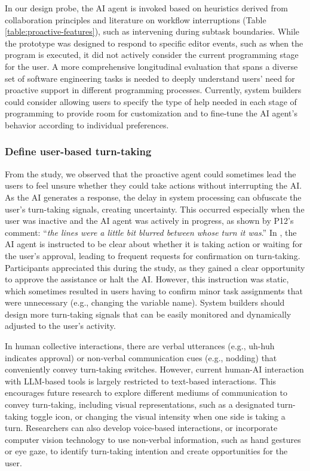 In our design probe, the AI agent is invoked based on heuristics derived from collaboration principles and literature on workflow interruptions (Table \ref{table:proactive-features}), such as intervening during subtask boundaries.
While the prototype was designed to respond to specific editor events, such as when the program is executed, it did not actively consider the current programming stage for the user.
A more comprehensive longitudinal evaluation that spans a diverse set of software engineering tasks is needed to deeply understand users' need for proactive support in different programming processes.
Currently, system builders could consider allowing users to specify the type of help needed in each stage of programming to provide room for customization and to fine-tune the AI agent's behavior according to individual preferences.


\subsubsection{\textbf{Define user-based turn-taking}}
From the study, we observed that the proactive agent could sometimes lead the users to feel unsure whether they could take actions without interrupting the AI.
As the AI generates a response, the delay in system processing can obfuscate the user's turn-taking signals, creating uncertainty. 
This occurred especially when the user was inactive and the AI agent was actively in progress, as shown by P12's comment: ``\textit{the lines were a little bit blurred between whose turn it was}.''
In \sys{}, the AI agent is instructed to be clear about whether it is taking action or waiting for the user's approval, leading to frequent requests for confirmation on turn-taking.
Participants appreciated this during the study, as they gained a clear opportunity to approve the assistance or halt the AI.
However, this instruction was static, which sometimes resulted in users having to confirm minor task assignments that were unnecessary (e.g., changing the variable name).
System builders should design more turn-taking signals that can be easily monitored and dynamically adjusted to the user's activity.

In human collective interactions, there are verbal utterances (e.g., uh-huh indicates approval) or non-verbal communication cues (e.g., nodding) that conveniently convey turn-taking switches. 
However, current human-AI interaction with LLM-based tools is largely restricted to text-based interactions. 
This encourages future research to explore different mediums of communication to convey turn-taking, including visual representations, such as a designated turn-taking toggle icon, or changing the visual intensity when one side is taking a turn. 
Researchers can also develop voice-based interactions, or incorporate computer vision technology to use non-verbal information, such as hand gestures or eye gaze, to identify turn-taking intention and create opportunities for the user.

